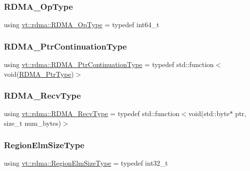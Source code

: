\subsubsection{\texorpdfstring{R\+D\+M\+A\+\_\+\+Op\+Type}{RDMA\_OpType}}
{\footnotesize\ttfamily using \hyperlink{namespacevt_1_1rdma_a9b966d9780a2b41afe7cd7b7b4b20300}{vt\+::rdma\+::\+R\+D\+M\+A\+\_\+\+Op\+Type} = typedef int64\+\_\+t}

\mbox{\label{namespacevt_1_1rdma_a6e46099fefaf428990d215e6e6d12645}} 
\subsubsection{\texorpdfstring{R\+D\+M\+A\+\_\+\+Ptr\+Continuation\+Type}{RDMA\_PtrContinuationType}}
{\footnotesize\ttfamily using \hyperlink{namespacevt_1_1rdma_a6e46099fefaf428990d215e6e6d12645}{vt\+::rdma\+::\+R\+D\+M\+A\+\_\+\+Ptr\+Continuation\+Type} = typedef std\+::function$<$void(\hyperlink{namespacevt_aab05b4a584f7ee835a6d0f66915cf59b}{R\+D\+M\+A\+\_\+\+Ptr\+Type})$>$}

\mbox{\label{namespacevt_1_1rdma_a36020f2b7ae371b6ddc8ec9caffb72d2}} 
\subsubsection{\texorpdfstring{R\+D\+M\+A\+\_\+\+Recv\+Type}{RDMA\_RecvType}}
{\footnotesize\ttfamily using \hyperlink{namespacevt_1_1rdma_a36020f2b7ae371b6ddc8ec9caffb72d2}{vt\+::rdma\+::\+R\+D\+M\+A\+\_\+\+Recv\+Type} = typedef std\+::function$<$void(std\+::byte$\ast$ ptr, size\+\_\+t num\+\_\+bytes)$>$}

\mbox{\label{namespacevt_1_1rdma_ac07ef96e399913495fde1da0f83f684c}} 
\subsubsection{\texorpdfstring{Region\+Elm\+Size\+Type}{RegionElmSizeType}}
{\footnotesize\ttfamily using \hyperlink{namespacevt_1_1rdma_ac07ef96e399913495fde1da0f83f684c}{vt\+::rdma\+::\+Region\+Elm\+Size\+Type} = typedef int32\+\_\+t}

